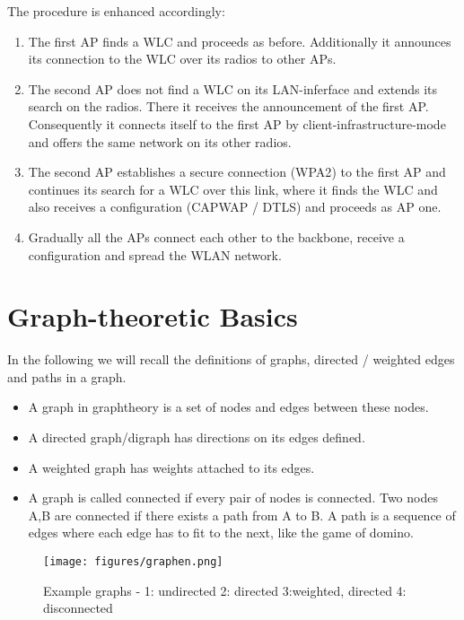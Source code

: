 	The procedure is enhanced accordingly:
	
	\begin{enumerate}
	  \item The first \ac{AP} finds a \ac{WLC} and proceeds as before. Additionally it announces its connection to the \ac{WLC} over its radios to other APs.
	  
	  \item The second \ac{AP} does not find a \ac{WLC} on its \ac{LAN}-inferface and extends its search on the radios. 
	    There it receives the announcement of the first \ac{AP}.
	    Consequently it connects itself to the first AP by client-infrastructure-mode and offers the same network on its other radios.
	    
	  \item The second \ac{AP} establishes a secure connection (\ac{WPA2}) to the first \ac{AP} and continues its search for a \ac{WLC} over this link, 
	    where it finds the \ac{WLC} and also receives a configuration (\ac{CAPWAP} / \ac{DTLS}) and proceeds as \ac{AP} one.
	    
	  \item Gradually all the APs connect each other to the backbone, receive a configuration and spread the \ac{WLAN} network.
	\end{enumerate}
	
\section{Graph-theoretic Basics}
  In the following we will recall the definitions of graphs, directed / weighted edges and paths in a graph.
  \begin{itemize}
    \item A graph in graphtheory is a set of nodes and edges between these nodes.
    \item A directed graph/digraph has directions on its edges defined.
    \item A weighted graph has weights attached to its edges.
    \item A graph is called connected if every pair of nodes is connected. 
      Two nodes A,B are connected if there exists a path from A to B.
      A path is a sequence of edges where each edge has to fit to the next, like the game of domino.
  \end{itemize}

  \begin{figure}[th!]
    \centering
    \texttt{[image: figures/graphen.png]}
    \caption{Example graphs - 1: undirected 2: directed 3:weighted, directed 4: disconnected}
    \label{fig:graphen}
  \end{figure}

